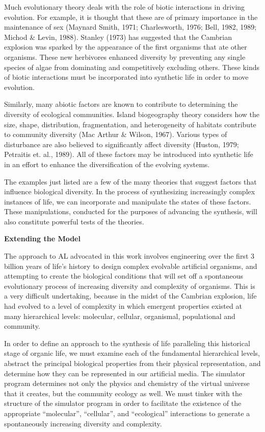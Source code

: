 Much evolutionary theory deals with the role of biotic interactions in driving
evolution.  For example, it is thought that these are of primary importance in
the maintenance of sex (Maynard Smith, 1971; Charlesworth, 1976; Bell, 1982,
1989; Michod \& Levin, 1988).  Stanley (1973) has suggested that the Cambrian
explosion was sparked by the appearance of the first organisms that ate other
organisms.  These new herbivores enhanced diversity by preventing any single
species of algae from dominating and competitively excluding others.  These
kinds of biotic interactions must be incorporated into synthetic life in order
to move evolution.

Similarly, many abiotic factors are known to contribute to determining the
diversity of ecological communities.  Island biogeography theory considers
how the size, shape, distribution, fragmentation, and heterogeneity of
habitats contribute to community diversity (Mac Arthur \& Wilson, 1967).
Various types of disturbance are also believed to significantly affect
diversity (Huston, 1979; Petraitis et. al., 1989).  All of these factors
may be introduced into synthetic life in an effort to enhance the
diversification of the evolving systems.

The examples just listed are a few of the many theories that suggest factors
that influence biological diversity.  In the process of synthesizing
increasingly complex instances of life, we can incorporate and manipulate
the states of these factors.  These manipulations, conducted for the purposes
of advancing the synthesis, will also constitute powerful tests of the
theories.

\LP
\bf Extending the Model\rm
\eLP

The approach to AL advocated in this work involves engineering over the
first 3 billion years of life's history to design complex evolvable
artificial organisms, and attempting to create the biological conditions
that will set off a spontaneous evolutionary process of increasing
diversity and complexity of organisms.  This is a very difficult
undertaking, because in the midst of the Cambrian explosion, life had
evolved to a level of complexity in which emergent properties existed at
many hierarchical levels: molecular, cellular, organismal, populational
and community.

In order to define an approach to the synthesis of life paralleling this
historical stage of organic life, we must examine
each of the fundamental hierarchical levels, abstract the principal
biological properties from their physical representation, and determine
how they can be represented in our artificial media.
The simulator program determines not only the physics and chemistry of
the virtual universe that it creates, but the community ecology as well.
We must tinker with the structure of the simulator program in order to
facilitate the existence of the appropriate ``molecular'', ``cellular'',
and ``ecological'' interactions to generate a spontaneously increasing
diversity and complexity.

